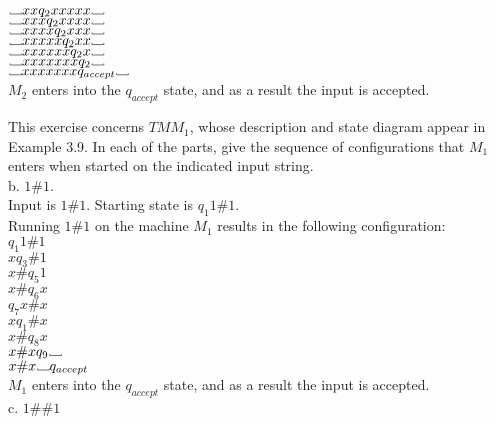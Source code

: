 \documentclass[12pt]{article}
\newcommand\Vtextvisiblespace[1][.8em]{%
	\mbox{\kern.07em\vrule height.3ex}%
	\vbox{\hrule width#1}%
	\hbox{\vrule height.3ex}}
\begin{document}
$\Vtextvisiblespace xx        q_2 xxxxx   \Vtextvisiblespace  $  \\
$\Vtextvisiblespace xxx       q_2 xxxx    \Vtextvisiblespace  $  \\
$\Vtextvisiblespace xxxx      q_2 xxx     \Vtextvisiblespace  $  \\
$\Vtextvisiblespace xxxxx     q_2 xx      \Vtextvisiblespace  $  \\
$\Vtextvisiblespace xxxxxx    q_2 x       \Vtextvisiblespace  $  \\
$\Vtextvisiblespace xxxxxxx   q_2         \Vtextvisiblespace  $  \\
$\Vtextvisiblespace xxxxxxx   q_{accept}  \Vtextvisiblespace  $  \\
$M_2$ enters into the $q_{accept}$ state, and as a result the input is accepted. \\

\pagebreak

This exercise concerns $TM M_1$, whose description and state diagram appear in 
Example 3.9. In each of the parts, give the sequence of configurations that $M_1$ 
enters when started on the indicated input string. \\

b. $1\#1$. \\

Input is $1\#1$. Starting state is $q_1 1\#1$. \\
Running $1\#1$ on the machine $M_1$ results in the following configuration: \\

$       q_1 1 \# 1  $ \\
$x      q_3 \# 1    $ \\
$x \#   q_5 1       $ \\
$x \#   q_6 x       $ \\
$       q_7 x \# x  $ \\
$x      q_1 \# x    $ \\
$x \#   q_8 x       $ \\
$x \# x q_9 \Vtextvisiblespace $ \\
$x \# x \Vtextvisiblespace q_{accept} $ \\
$M_1$ enters into the $q_{accept}$ state, and as a result the input is accepted. \\

c. $1\#\#1$ \\
\end{document}
